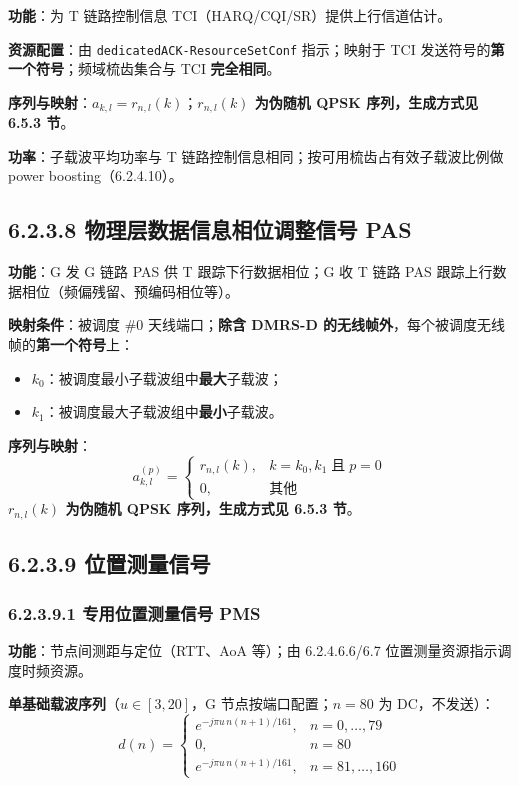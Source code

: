 \documentclass[11pt,a4paper]{ctexart}
\begin{document}
\textbf{功能}：为 T 链路控制信息 TCI（HARQ/CQI/SR）提供上行信道估计。

\textbf{资源配置}：由 \texttt{dedicatedACK-ResourceSetConf} 指示；映射于 TCI 发送符号的\textbf{第一个符号}；频域梳齿集合与 TCI \textbf{完全相同}。

\textbf{序列与映射}：$a_{k,l}=r_{n,l}(k)$；\textbf{$r_{n,l}(k)$ 为伪随机 QPSK 序列，生成方式见 6.5.3 节}。

\textbf{功率}：子载波平均功率与 T 链路控制信息相同；按可用梳齿占有效子载波比例做 power boosting（6.2.4.10）。

\subsection{6.2.3.8 物理层数据信息相位调整信号 PAS}

\textbf{功能}：G 发 G 链路 PAS 供 T 跟踪下行数据相位；G 收 T 链路 PAS 跟踪上行数据相位（频偏残留、预编码相位等）。

\textbf{映射条件}：被调度 \#0 天线端口；\textbf{除含 DMRS-D 的无线帧外}，每个被调度无线帧的\textbf{第一个符号}上：
\begin{itemize}[nosep]
  \item $k_0$：被调度最小子载波组中\textbf{最大}子载波；
  \item $k_1$：被调度最大子载波组中\textbf{最小}子载波。
\end{itemize}

\textbf{序列与映射}：
\begin{equation}
a_{k,l}^{(p)} = \begin{cases} r_{n,l}(k), & k=k_0,k_1 \;\text{且}\; p=0 \\ 0, & \text{其他} \end{cases}
\end{equation}
\textbf{$r_{n,l}(k)$ 为伪随机 QPSK 序列，生成方式见 6.5.3 节}。

\subsection{6.2.3.9 位置测量信号}

\subsubsection{6.2.3.9.1 专用位置测量信号 PMS}

\textbf{功能}：节点间测距与定位（RTT、AoA 等）；由 6.2.4.6.6/6.7 位置测量资源指示调度时频资源。

\textbf{单基础载波序列}（$u{\in}[3,20]$，G 节点按端口配置；$n{=}80$ 为 DC，不发送）：
\begin{equation}
d(n) = \begin{cases}
e^{-j\pi u\, n (n+1) / 161}, & n=0,\ldots,79 \\[0.2em]
0, & n=80 \\[0.2em]
e^{-j\pi u\, n (n+1) / 161}, & n=81,\ldots,160
\end{cases}
\end{equation}
\end{document}
